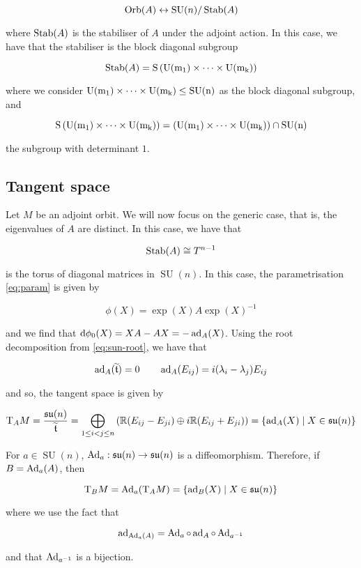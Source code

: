 \documentclass{report}
\DeclareMathOperator{\SU}{SU}
\newcommand{\su}{\mathfrak{su}}
\renewcommand{\tilde}{\widetilde}
\begin{document}
\[\Orb(A) \leftrightarrow \SU(n)/\Stab(A)\]

where \(\operatorname{Stab}(A)\) is the stabiliser of \(A\) under the adjoint action. In this case, we have that the stabiliser is the block diagonal subgroup

\[\operatorname{Stab}(A) = \rm S\left(\rm U(m_1) \times \dots \times \rm U(m_k)\right)\]

where we consider \(\rm U(m_1) \times \cdots \times \rm U(m_k) \le \SU(n)\) as the block diagonal subgroup, and

\[\rm S\left(\rm U(m_1) \times \dots \times \rm U(m_k)\right) = \left(\rm U(m_1) \times \cdots \times \rm U(m_k)\right) \cap \SU(n)\]

the subgroup with determinant \(1\).

\subsection{Tangent space}

\label{subsec:tangent}

Let \(M\) be an adjoint orbit. We will now focus on the generic case, that is, the eigenvalues of \(A\) are distinct. In this case, we have that

\[\operatorname{Stab}(A) \cong T^{n-1}\]

is the torus of diagonal matrices in \(\SU(n)\). In this case, the parametrisation \cref{eq:param} is given by

\[\phi(X) = \exp(X)A\exp(X)^{-1}\]

and we find that \(\dd\phi_0(X) = XA - AX = -\operatorname{ad}_A(X)\). Using the root decomposition from \cref{eq:sun-root}, we have that

\[\ad_A(\tilde \mft) = 0 \qquad \ad_A(E_{ij}) = i(\lambda_i - \lambda_j)E_{ij}\]

and so, the tangent space is given by

\[\TT_AM = \frac{\su(n)}{\tilde \mft} = \bigoplus_{1 \le i < j \le n} \left(\R(E_{ij} - E_{ji}) \oplus i\R (E_{ij} + E_{ji})\right) = \{\ad_A(X) \mid X \in \su(n)\}\]

For \(a \in \SU(n)\), \(\Ad_a : \su(n) \to \su(n)\) is a diffeomorphism. Therefore, if \(B = \operatorname{Ad}_a(A)\), then

\[\T_B M = \Ad_a(\T_AM) = \{\ad_B(X) \mid X \in \su(n)\}\]

where we use the fact that

\[\operatorname{ad}_{\operatorname{Ad}_a(A)} = \operatorname{Ad}_a \circ \operatorname{ad}_A \circ \operatorname{Ad}_{a^{-1}}\]

and that \(\operatorname{Ad}_{a^{-1}}\) is a bijection.
\end{document}
